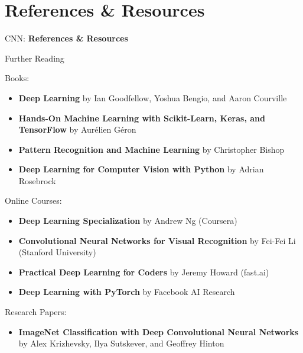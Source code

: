 \section{References \& Resources}
\begin{frame}{}
    \LARGE CNN: \textbf{References \& Resources}
\end{frame}

\begin{frame}{Further Reading}
\begin{block}{Books:}
    \begin{itemize}
    \item \textbf{Deep Learning} by Ian Goodfellow, Yoshua Bengio, and Aaron Courville \vspace{0.5em}
    \item \textbf{Hands-On Machine Learning with Scikit-Learn, Keras, and TensorFlow} by Aurélien Géron \vspace{0.5em}
    \item \textbf{Pattern Recognition and Machine Learning} by Christopher Bishop \vspace{0.5em}
    \item \textbf{Deep Learning for Computer Vision with Python} by Adrian Rosebrock
    \end{itemize}
\end{block}
\framebreak
\begin{block}{Online Courses:}
    \begin{itemize}
        \item \textbf{Deep Learning Specialization} by Andrew Ng (Coursera) \vspace{0.5em}
        \item \textbf{Convolutional Neural Networks for Visual Recognition} by Fei-Fei Li (Stanford University) \vspace{0.5em}
        \item \textbf{Practical Deep Learning for Coders} by Jeremy Howard (fast.ai) \vspace{0.5em}
        \item \textbf{Deep Learning with PyTorch} by Facebook AI Research \vspace{0.5em}
    \end{itemize}
\end{block}
\framebreak
\begin{block}{Research Papers:}
    \begin{itemize}
        \item \textbf{ImageNet Classification with Deep Convolutional Neural Networks} by Alex Krizhevsky, Ilya Sutskever, and Geoffrey Hinton \vspace{0.5em}

\end{itemize}
\end{block}
\end{frame}
